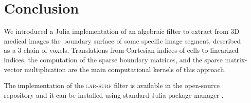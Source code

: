 
\section{Conclusion}\label{sec:conclusion}




We introduced a Julia implementation of an algebraic filter to extract from 3D medical images the
boundary surface of some specific image segment, described as a 3-chain of voxels. Translations from
Cartesian indices of cells to linearized indices, the computation of the sparse boundary matrices, and the
sparse matrix-vector multiplication are the main computational kernels of this approach. 

The implementation of the \textsc{lar-surf} filter is available in the open-source repository and it can be installed using standard Julia package manager \cite{larsurf-github}.

